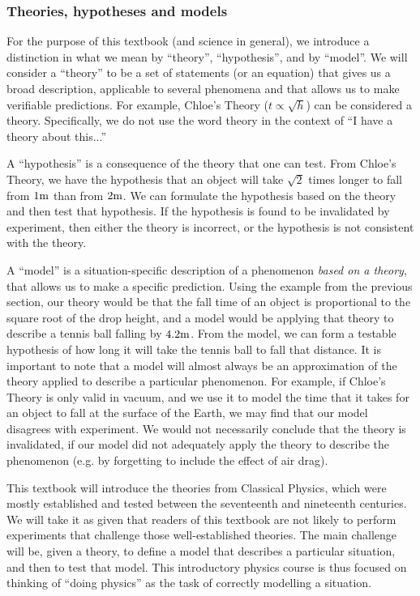 \subsubsection{Theories, hypotheses and models}

For the purpose of this textbook (and science in general), we introduce a distinction in what we mean by ``theory'', ``hypothesis'', and by ``model''. We will consider a ``theory'' to be a set of statements (or an equation) that gives us a broad description, applicable to several phenomena and that allows us to make verifiable predictions. For example, Chloe's Theory ($t \propto \sqrt{h}$) can be considered a theory. Specifically, we do not use the word theory in the context of ``I have a theory about this...''

A ``hypothesis'' is a consequence of the theory that one can test. From Chloe's Theory, we have the hypothesis that an object will take $\sqrt{2}$ times longer to fall from $1 {\rm m}$ than from $2 {\rm m}$. We can formulate the hypothesis based on the theory and then test that hypothesis. If the hypothesis is found to be invalidated by experiment, then either the theory is incorrect, or the hypothesis is not consistent with the theory.

A ``model'' is a situation-specific description of a phenomenon \textit{based on a theory}, that allows us to make a specific prediction. Using the example from the previous section, our theory would be that the fall time of an object is proportional to the square root of the drop height, and a model would be applying that theory to describe a tennis ball falling by $4.2 {\rm m}$. From the model, we can form a testable hypothesis of how long it will take the tennis ball to fall that distance. It is important to note that a model will almost always be an approximation of the theory applied to describe a particular phenomenon. For example, if Chloe's Theory is only valid in vacuum, and we use it to model the time that it takes for an object to fall at the surface of the Earth, we may find that our model disagrees with experiment. We would not necessarily conclude that the theory is invalidated, if our model did not adequately apply the theory to describe the phenomenon (e.g. by forgetting to include the effect of air drag).

This textbook will introduce the theories from Classical Physics, which were mostly established and tested between the seventeenth and nineteenth centuries. We will take it as given that readers of this textbook are not likely to perform experiments that challenge those well-established theories. The main challenge will be, given a theory, to define a model that describes a particular situation, and then to test that model. This introductory physics course is thus focused on thinking of ``doing physics'' as the task of correctly modelling a situation.

